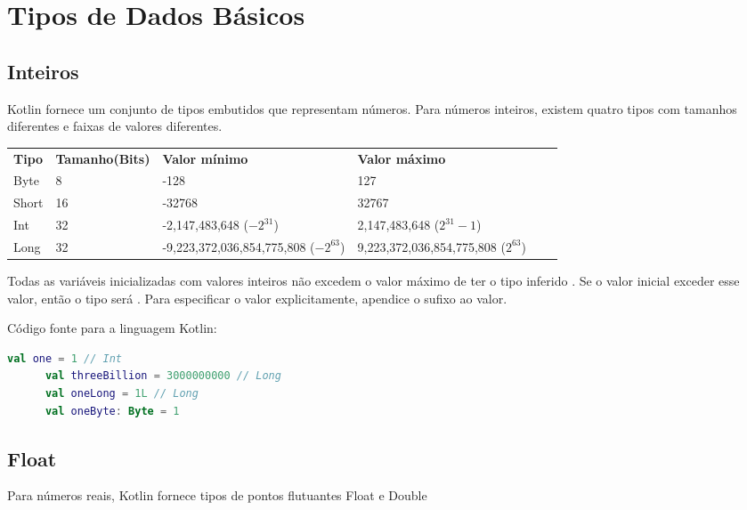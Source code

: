 \section{Tipos de Dados B\'{a}sicos}
  
  \subsection{Inteiros}
  Kotlin fornece um conjunto de tipos embutidos que representam números.
  Para números inteiros, existem quatro tipos com tamanhos diferentes e faixas de valores diferentes.
  
  \begin{table}[ht]
      \centering
      
      \begin{tabular}{p{2cm} p{2.5cm} p{6.0cm} p{6.0cm}|cp{1cm}}
      \textbf{Tipo} \centering & \textbf{Tamanho(Bits)} & \textbf{Valor mínimo} & \textbf{Valor máximo} \\ 
          Byte \centering    & 8  \centering  & -128   & 127                 \\ 
          Short \centering  & 16  \centering & -32768   & 32767             \\ 
          Int \centering    & 32  \centering &  -2,147,483,648 ($-2 ^{31}$)      &2,147,483,648 ($2^{31}-1$)            \\ 
          Long \centering    & 32  \centering &  -9,223,372,036,854,775,808 ($-2 ^{63}$)      &9,223,372,036,854,775,808 ($2^{63}$)\\ 
      
      \end{tabular}
      \label{Tabela1}
      \end{table}
      Todas as variáveis inicializadas com valores inteiros não excedem o valor 
      máximo de ter o tipo inferido . Se o valor inicial exceder esse valor, 
      então o tipo será . Para especificar o valor explicitamente, apendice o sufixo ao valor.
     

    C\'{o}digo fonte para a linguagem Kotlin:
    \begin{lstlisting}[label={lst:example1}, language=Kotlin]
      val one = 1 // Int
      val threeBillion = 3000000000 // Long
      val oneLong = 1L // Long
      val oneByte: Byte = 1
    \end{lstlisting}

    

    \subsection{Float}
    Para números reais, Kotlin fornece tipos de pontos flutuantes Float e Double
    
